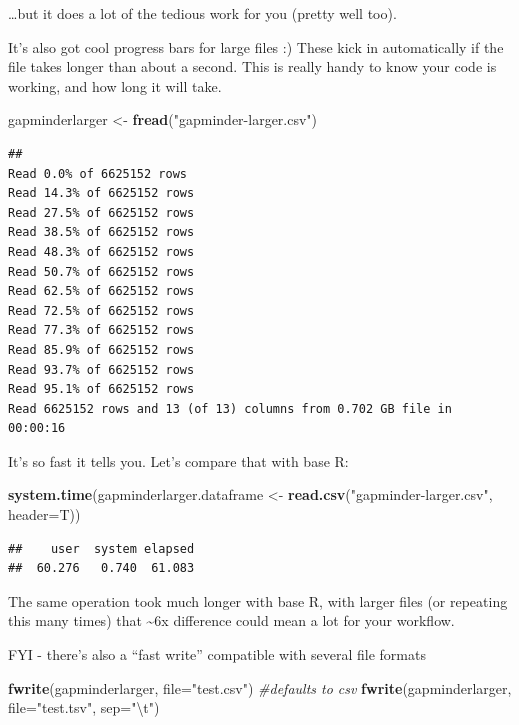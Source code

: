 \documentclass[]{article}
\newenvironment{Shaded}{\begin{snugshade}}{\end{snugshade}}
\newcommand{\KeywordTok}[1]{\textcolor[rgb]{0.13,0.29,0.53}{\textbf{{#1}}}}
\newcommand{\DataTypeTok}[1]{\textcolor[rgb]{0.13,0.29,0.53}{{#1}}}
\newcommand{\CharTok}[1]{\textcolor[rgb]{0.31,0.60,0.02}{{#1}}}
\newcommand{\StringTok}[1]{\textcolor[rgb]{0.31,0.60,0.02}{{#1}}}
\newcommand{\CommentTok}[1]{\textcolor[rgb]{0.56,0.35,0.01}{\textit{{#1}}}}
\newcommand{\NormalTok}[1]{{#1}}
\begin{document}
\ldots{}but it does a lot of the tedious work for you (pretty well too).

It's also got cool progress bars for large files :) These kick in
automatically if the file takes longer than about a second. This is
really handy to know your code is working, and how long it will take.

\begin{Shaded}
\begin{Highlighting}[]
\NormalTok{gapminderlarger <-}\StringTok{ }\KeywordTok{fread}\NormalTok{(}\StringTok{"gapminder-larger.csv"}\NormalTok{)}
\end{Highlighting}
\end{Shaded}

\begin{verbatim}
## 
Read 0.0% of 6625152 rows
Read 14.3% of 6625152 rows
Read 27.5% of 6625152 rows
Read 38.5% of 6625152 rows
Read 48.3% of 6625152 rows
Read 50.7% of 6625152 rows
Read 62.5% of 6625152 rows
Read 72.5% of 6625152 rows
Read 77.3% of 6625152 rows
Read 85.9% of 6625152 rows
Read 93.7% of 6625152 rows
Read 95.1% of 6625152 rows
Read 6625152 rows and 13 (of 13) columns from 0.702 GB file in 00:00:16
\end{verbatim}

It's so fast it tells you. Let's compare that with base R:

\begin{Shaded}
\begin{Highlighting}[]
\KeywordTok{system.time}\NormalTok{(gapminderlarger.dataframe <-}\StringTok{ }\KeywordTok{read.csv}\NormalTok{(}\StringTok{"gapminder-larger.csv"}\NormalTok{, }\DataTypeTok{header=}\NormalTok{T))}
\end{Highlighting}
\end{Shaded}

\begin{verbatim}
##    user  system elapsed 
##  60.276   0.740  61.083
\end{verbatim}

The same operation took much longer with base R, with larger files (or
repeating this many times) that \textasciitilde{}6x difference could
mean a lot for your workflow.

FYI - there's also a ``fast write'' compatible with several file formats

\begin{Shaded}
\begin{Highlighting}[]
\KeywordTok{fwrite}\NormalTok{(gapminderlarger, }\DataTypeTok{file=}\StringTok{"test.csv"}\NormalTok{) }\CommentTok{#defaults to csv}
\KeywordTok{fwrite}\NormalTok{(gapminderlarger, }\DataTypeTok{file=}\StringTok{"test.tsv"}\NormalTok{, }\DataTypeTok{sep=}\StringTok{"}\CharTok{\textbackslash{}t}\StringTok{"}\NormalTok{)}
\end{Highlighting}
\end{Shaded}
\end{document}
